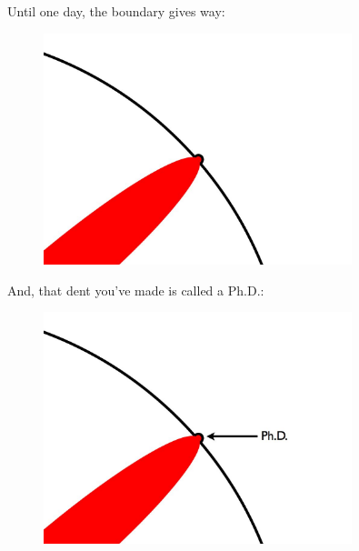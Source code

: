 \documentclass[10pt]{beamer}
\begin{document}
\begin{frame}{}
  Until one day, the boundary gives way:
  \begin{figure}[hb]
    \centering
    \includegraphics[width=0.8\textwidth]{images/PhDKnowledge-009.png}
  \end{figure}
\end{frame}


\begin{frame}{}
  And, that dent you've made is called a Ph.D.:

  \begin{figure}[hb]
    \centering
    \includegraphics[width=0.8\textwidth]{images/PhDKnowledge-010.png}
  \end{figure}
\end{frame}
\end{document}

